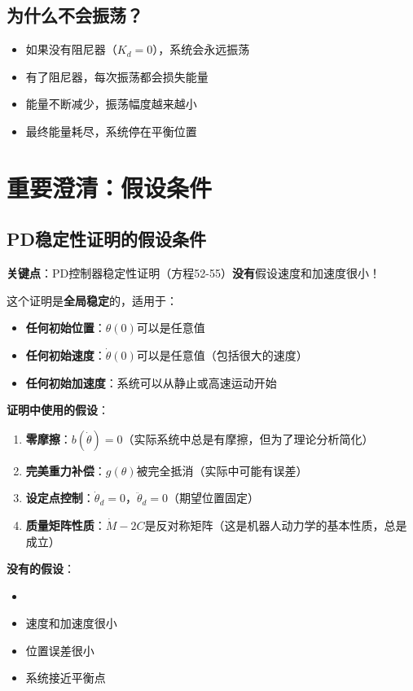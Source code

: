 \documentclass{article}
\begin{document}
\subsection{为什么不会振荡？}

\begin{itemize}
\item 如果没有阻尼器（$K_d = 0$），系统会永远振荡
\item 有了阻尼器，每次振荡都会损失能量
\item 能量不断减少，振荡幅度越来越小
\item 最终能量耗尽，系统停在平衡位置
\end{itemize}

\section{重要澄清：假设条件}

\subsection{PD稳定性证明的假设条件}

\textbf{关键点}：PD控制器稳定性证明（方程52-55）\textbf{没有}假设速度和加速度很小！

这个证明是\textbf{全局稳定}的，适用于：
\begin{itemize}
\item \textbf{任何初始位置}：$\theta(0)$可以是任意值
\item \textbf{任何初始速度}：$\dot{\theta}(0)$可以是任意值（包括很大的速度）
\item \textbf{任何初始加速度}：系统可以从静止或高速运动开始
\end{itemize}

\textbf{证明中使用的假设}：
\begin{enumerate}
\item \textbf{零摩擦}：$b(\dot{\theta}) = 0$（实际系统中总是有摩擦，但为了理论分析简化）
\item \textbf{完美重力补偿}：$g(\theta)$被完全抵消（实际中可能有误差）
\item \textbf{设定点控制}：$\dot{\theta}_d = 0$，$\ddot{\theta}_d = 0$（期望位置固定）
\item \textbf{质量矩阵性质}：$\dot{M} - 2C$是反对称矩阵（这是机器人动力学的基本性质，总是成立）
\end{enumerate}

\textbf{没有的假设}：
\begin{itemize}
\item \item[$\times$] 速度和加速度很小
\item[$\times$] 位置误差很小
\item[$\times$] 系统接近平衡点
\end{itemize}
\end{document}
